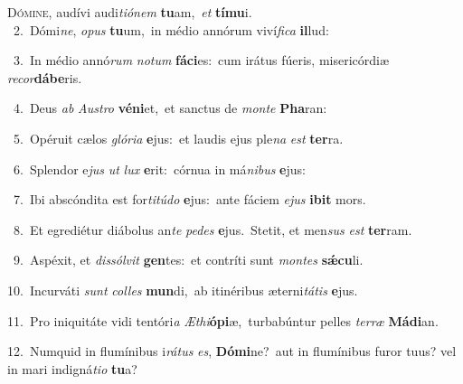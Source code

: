 \lettrine{\initial\textcolor{\initialcolor}{D}}{ómine,} audívi audi\-\textit{ti}\-\textit{ó}\textit{nem} \textbf{tu}\-am,~\star \textit{et} \textbf{tí}\-\textbf{mu}i.\\
{\numbfont\textcolor{\numbcolor}{~2.}}~Dómi\-\textit{ne}\-, \textit{o}\-\textit{pus} \textbf{tu}\-um,~\star in médio annórum viví\-\textit{fi}\-\textit{ca} \textbf{il}\-lud:\par
{\numbfont\textcolor{\numbcolor}{~3.}}~In médio annó\textit{rum} \textit{no}\-\textit{tum} \textbf{fá}\-\textbf{ci}es:~\star cum irátus fúeris, misericórdiæ \textit{re}\-\textit{cor}\textbf{dá}\textbf{be}ris.\par
{\numbfont\textcolor{\numbcolor}{~4.}}~Deus \textit{ab} \textit{Aus}\-\textit{tro} \textbf{vé}\-\textbf{ni}et,~\star et sanctus de \textit{mon}\-\textit{te} \textbf{Pha}\-ran:\par
{\numbfont\textcolor{\numbcolor}{~5.}}~Opéruit cælos \textit{gló}\-\textit{ri}\textit{a} \textbf{e}\-jus:~\star et laudis ejus ple\textit{na} \textit{est} \textbf{ter}\-ra.\par
{\numbfont\textcolor{\numbcolor}{~6.}}~Splendor e\textit{jus} \textit{ut} \textit{lux} \textbf{e}\-rit:~\star córnua in má\-\textit{ni}\-\textit{bus} \textbf{e}\-jus:\par
{\numbfont\textcolor{\numbcolor}{~7.}}~Ibi abscóndita est for\-\textit{ti}\-\textit{tú}\textit{do} \textbf{e}\-jus:~\star ante fáciem \textit{e}\-\textit{jus} \textbf{i}\-\textbf{bit} mors.\par
{\numbfont\textcolor{\numbcolor}{~8.}}~Et egrediétur diábolus an\textit{te} \textit{pe}\-\textit{des} \textbf{e}\-jus.~\star Stetit, et men\textit{sus} \textit{est} \textbf{ter}\-ram.\par
{\numbfont\textcolor{\numbcolor}{~9.}}~Aspéxit, et \textit{dis}\-\textit{sól}\textit{vit} \textbf{gen}\-tes:~\star et contríti sunt \textit{mon}\-\textit{tes} \textbf{sǽ}\-\textbf{cu}li.\par
{\numbfont\textcolor{\numbcolor}{10.}}~Incurváti \textit{sunt} \textit{col}\-\textit{les} \textbf{mun}\-di,~\star ab itinéribus æterni\-\textit{tá}\-\textit{tis} \textbf{e}\-jus.\par
{\numbfont\textcolor{\numbcolor}{11.}}~Pro iniquitáte vidi tentóri\textit{a} \textit{Æ}\-\textit{thi}\textbf{ó}\textbf{pi}æ,~\star turbabúntur pelles \textit{ter}\-\textit{ræ} \textbf{Má}\-\textbf{di}an.\par
{\numbfont\textcolor{\numbcolor}{12.}}~Numquid in flumínibus i\-\textit{rá}\-\textit{tus} \textit{es}\-, \textbf{Dó}\-\textbf{mi}ne?~\star aut in flumínibus furor tuus? vel in mari indigná\-\textit{ti}\-\textit{o} \textbf{tu}\-a?\par
